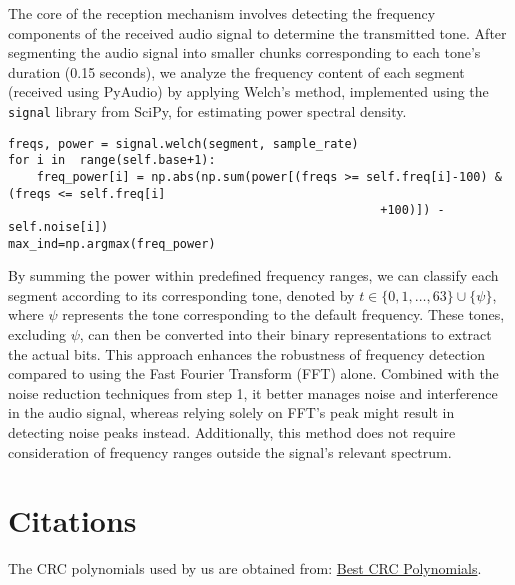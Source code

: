 \documentclass[11pt]{article}
\begin{document}
The core of the reception mechanism involves detecting the frequency components of the received audio signal to determine the transmitted tone. After segmenting the audio signal into smaller chunks corresponding to each tone's duration (0.15 seconds), we analyze the frequency content of each segment (received using PyAudio) by applying Welch's method, implemented using the \texttt{signal} library from SciPy, for estimating power spectral density.
\begin{tcolorbox}[colback=black!10!white, colframe=black]
    
\begin{verbatim} 
freqs, power = signal.welch(segment, sample_rate)
for i in  range(self.base+1):
    freq_power[i] = np.abs(np.sum(power[(freqs >= self.freq[i]-100) & (freqs <= self.freq[i]
                                                    +100)]) - self.noise[i])
max_ind=np.argmax(freq_power) \end{verbatim}
\end{tcolorbox}

By summing the power within predefined frequency ranges, we can classify each segment according to its corresponding tone, denoted by \( t \in \{0, 1, \ldots, 63\} \cup \{\psi\} \), where \(\psi\) represents the tone corresponding to the default frequency. These tones, excluding \(\psi\), can then be converted into their binary representations to extract the actual bits. This approach enhances the robustness of frequency detection compared to using the Fast Fourier Transform (FFT) alone. Combined with the noise reduction techniques from step 1, it better manages noise and interference in the audio signal, whereas relying solely on FFT's peak might result in detecting noise peaks instead. Additionally, this method does not require consideration of frequency ranges outside the signal's relevant spectrum.




\section{Citations}
The CRC polynomials used by us are obtained from: \href{https://users.ece.cmu.edu/~koopman/crc/hd5.html}{Best CRC Polynomials}.
\end{document}
